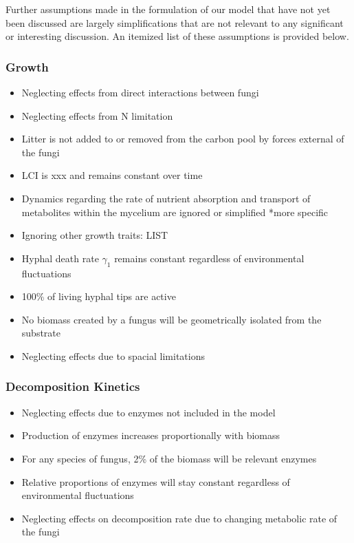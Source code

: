 \documentclass[12pt]{article}
\begin{document}
\begin{multicols}{2}
Further assumptions made in the formulation of our model that have not yet been discussed are largely simplifications that are not relevant to any significant or interesting discussion. An itemized list of these assumptions is provided below.
\subsubsection{Growth}
\begin{itemize}
	\item Neglecting effects from direct interactions between fungi
	\item Neglecting effects from N limitation
	\item Litter is not added to or removed from the carbon pool by forces external of the fungi
	\item LCI is xxx and remains constant over time
	\item Dynamics regarding the rate of nutrient absorption and transport of metabolites within the
	mycelium are ignored or simplified *more specific
	\item Ignoring other growth traits: LIST
	\item Hyphal death rate $\gamma_{1}$ remains constant regardless of environmental fluctuations
	\item 100\% of living hyphal tips are active
	\item No biomass created by a fungus will be geometrically isolated from the substrate
	\item Neglecting effects due to spacial limitations
\end{itemize}
\subsubsection{Decomposition Kinetics}
\begin{itemize}
	\item Neglecting effects due to enzymes not included in the model
	\item Production of enzymes increases proportionally with biomass
	\item For any species of fungus, 2\% of the biomass will be relevant enzymes
	\item Relative proportions of enzymes will stay constant regardless of environmental fluctuations
	\item Neglecting effects on decomposition rate due to changing metabolic rate of the fungi
\end{itemize}

\end{multicols}
\end{document}

